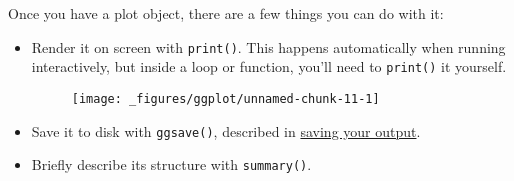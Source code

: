 Once you have a plot object, there are a few things you can do with it:

\begin{itemize}
\item
  Render it on screen with \texttt{print()}. This happens automatically
  when running interactively, but inside a loop or function, you'll need
  to \texttt{print()} it yourself. 

\begin{Shaded}
\begin{Highlighting}[]
\end{Highlighting}
\end{Shaded}

  \begin{figure}[H]
    \centering
    \texttt{[image: \_figures/ggplot/unnamed-chunk-11-1]}
  \end{figure}
\item
  Save it to disk with \texttt{ggsave()}, described in
  \protect\hyperlink{sec:saving}{saving your output}.

\begin{Shaded}
\begin{Highlighting}[]
\NormalTok{(}\NormalTok{, } \NormalTok{, } \NormalTok{)}
\end{Highlighting}
\end{Shaded}
\item
  Briefly describe its structure with \texttt{summary()}.


\end{itemize}
